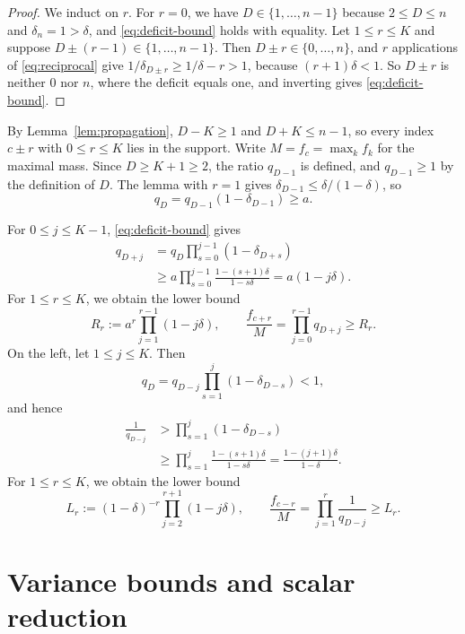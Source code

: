 \documentclass[ECP]{ejpecp}
\begin{document}
\begin{proof}
  We induct on $r$. For $r=0$, we have $D\in\{1,\ldots,n-1\}$ because
  $2\leq D\leq n$ and $\delta_n=1>\delta$, and \eqref{eq:deficit-bound} holds
  with equality. Let $1\leq r\leq K$ and suppose
  $D\pm(r-1)\in\{1,\ldots,n-1\}$. Then $D\pm r\in\{0,\ldots,n\}$, and $r$
  applications of \eqref{eq:reciprocal} give $1/\delta_{D\pm r}\geq1/\delta-r>1$,
  because $(r+1)\delta<1$. So $D\pm r$ is neither $0$ nor $n$, where the
  deficit equals one, and inverting gives \eqref{eq:deficit-bound}.
\end{proof}

By Lemma~\ref{lem:propagation}, $D-K\geq1$ and $D+K\leq n-1$, so every index
$c\pm r$ with $0\leq r\leq K$ lies in the support. Write $M=f_c=\max_k f_k$
for the maximal mass. Since $D\geq K+1\geq2$, the ratio $q_{D-1}$ is
defined, and $q_{D-1}\geq1$ by the definition of $D$.
The lemma with $r=1$ gives $\delta_{D-1}\leq\delta/(1-\delta)$, so
\[
  q_D=q_{D-1}(1-\delta_{D-1})\geq a.
\]

For $0\leq j\leq K-1$, \eqref{eq:deficit-bound} gives
\[
\begin{aligned}
  q_{D+j}
  &=q_D\prod_{s=0}^{j-1}(1-\delta_{D+s})\\
  &\geq a\prod_{s=0}^{j-1}
    \frac{1-(s+1)\delta}{1-s\delta}
   =a(1-j\delta).
\end{aligned}
\]
For $1\leq r\leq K$, we obtain the lower bound
\begin{equation}\label{eq:right-mass-bound}
  R_r:=a^r\prod_{j=1}^{r-1}(1-j\delta),
  \qquad
  \frac{f_{c+r}}M=\prod_{j=0}^{r-1}q_{D+j}\geq R_r.
\end{equation}
On the left, let $1\leq j\leq K$. Then
\[
  q_D=q_{D-j}\prod_{s=1}^j(1-\delta_{D-s})<1,
\]
and hence
\[
\begin{aligned}
  \frac1{q_{D-j}}
  &>\prod_{s=1}^j(1-\delta_{D-s})\\
  &\geq\prod_{s=1}^j
    \frac{1-(s+1)\delta}{1-s\delta}
   =\frac{1-(j+1)\delta}{1-\delta}.
\end{aligned}
\]
For $1\leq r\leq K$, we obtain the lower bound
\begin{equation}\label{eq:left-mass-bound}
  L_r:=(1-\delta)^{-r}
  \prod_{j=2}^{r+1}(1-j\delta),
  \qquad
  \frac{f_{c-r}}M=\prod_{j=1}^r\frac1{q_{D-j}}\geq L_r.
\end{equation}

\section{Variance bounds and scalar reduction}
\label{sec:variance}
\end{document}
